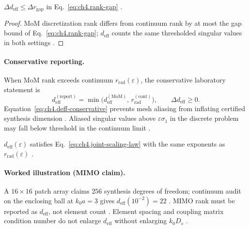 \begin{corollary}
\label{cor:ch4.deff-mesh-gap}
\(\Delta d_{\mathrm{eff}}\le\Delta r_{\mathrm{gap}}\) in Eq.~\eqref{eq:ch4.rank-gap} \cite{harrington2001,devaney2004,stratton1941,jackson1999}.
\end{corollary}
\begin{proof}
MoM discretization rank differs from continuum rank by at most the gap bound of Eq.~\eqref{eq:ch4.rank-gap}; \(d_{\mathrm{eff}}\) counts
the same thresholded singular values in both settings \cite{harrington2001,hansen1988,devaney2004}.
\end{proof}

\paragraph{Conservative reporting.}
When MoM rank exceeds continuum \(r_{\mathrm{rad}}(\varepsilon)\), the conservative laboratory statement is
\begin{equation}
\label{eq:ch4.deff-conservative}
d_{\mathrm{eff}}^{\mathrm{(report)}}
=
\min\big(d_{\mathrm{eff}}^{\mathrm{(MoM)}},\,r_{\mathrm{rad}}^{\mathrm{(cont)}}\big),
\qquad
\Delta d_{\mathrm{eff}}\ge0.
\end{equation}
Equation~\eqref{eq:ch4.deff-conservative} prevents mesh aliasing from inflating certified synthesis dimension \cite{hansen1988,stratton1941,harrington2001}.
Aliased singular values above \(\varepsilon\sigma_{1}\) in the discrete problem may fall below threshold in the continuum limit
\cite{devaney2004,collin2001,jackson1999}.

\begin{proposition}
\label{prop:ch4.deff-joint-scaling}
\(d_{\mathrm{eff}}(\varepsilon)\) satisfies Eq.~\eqref{eq:ch4.joint-scaling-law} with the same exponents as \(r_{\mathrm{rad}}(\varepsilon)\)
\cite{hansen1988,stratton1941,harrington2001,devaney2004,jackson1999}.
\end{proposition}

\paragraph{Worked illustration (MIMO claim).}
A \(16\times16\) patch array claims \(256\) synthesis degrees of freedom; continuum audit on the enclosing ball at \(k_{0}a=3\) gives
\(d_{\mathrm{eff}}(10^{-2})=22\) \cite{harrington2001,collin2001,hansen1988,jackson1999}. MIMO rank must be reported as
\(d_{\mathrm{eff}}\), not element count \cite{devaney2004,stratton1941}. Element spacing and coupling matrix condition number do not enlarge
\(d_{\mathrm{eff}}\) without enlarging \(k_{0}D_{s}\) \cite{hansen1988,harrington2001}.

